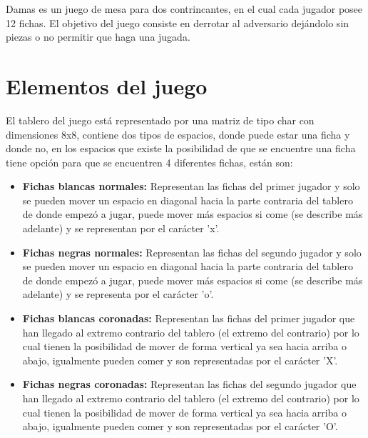\documentclass[12pt]{article}
\begin{document}
    Damas es un juego de mesa para dos contrincantes, en el cual cada jugador posee 12 fichas. El objetivo del juego consiste en derrotar al adversario dejándolo sin piezas o no permitir que haga una jugada.
    
\section{Elementos del juego}

    El tablero del juego está representado por una matriz de tipo char con dimensiones 8x8, contiene dos tipos de espacios, donde puede estar una ficha y donde no, en los espacios que existe la posibilidad de que se encuentre una ficha tiene opción para que se encuentren 4 diferentes fichas, están son:
    
    \begin{itemize}
        \item\textbf{Fichas blancas normales:}
            Representan las fichas del primer jugador y solo se pueden mover un espacio en diagonal hacia la parte contraria del tablero de donde empezó a jugar, puede mover más espacios si come (se describe más adelante) y se representan por el carácter 'x'.
            
        \item\textbf{Fichas negras normales:}
            Representan las fichas del segundo jugador y solo se pueden mover un espacio en diagonal hacia la parte contraria del tablero de donde empezó a jugar, puede mover más espacios si come (se describe más adelante) y se representa por el carácter 'o'.
            
        \item\textbf{Fichas blancas coronadas:}
            Representan las fichas del primer jugador que han llegado al extremo contrario del tablero (el extremo del contrario) por lo cual tienen la posibilidad de mover de forma vertical ya sea hacia arriba o abajo, igualmente pueden comer y son representadas por el carácter 'X'.
            
        \item\textbf{Fichas negras coronadas:}
            Representan las fichas del segundo jugador que han llegado al extremo contrario del tablero (el extremo del contrario) por lo cual tienen la posibilidad de mover de forma vertical ya sea hacia arriba o abajo, igualmente pueden comer y son representadas por el carácter 'O'.
            
    \end{itemize}
    
\end{document}
